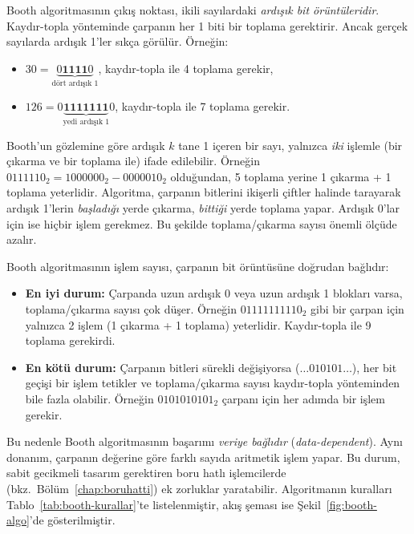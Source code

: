 Booth algoritmasının çıkış noktası, ikili sayılardaki \emph{ardışık bit örüntüleridir}. Kaydır-topla yönteminde çarpanın her 1 biti bir toplama gerektirir. Ancak gerçek sayılarda ardışık 1'ler sıkça görülür. Örneğin:
%
\begin{itemize}[nosep]
\item $30 = \underbrace{0\textbf{1111}0}_{\text{dört ardışık 1}}$, kaydır-topla ile 4 toplama gerekir,
\item $126 = 0\underbrace{\textbf{1111111}}_{\text{yedi ardışık 1}}0$, kaydır-topla ile 7 toplama gerekir.
\end{itemize}
%
Booth'un gözlemine göre ardışık $k$ tane 1 içeren bir sayı, yalnızca \emph{iki} işlemle (bir çıkarma ve bir toplama ile) ifade edilebilir. Örneğin $0111110_2 = 1000000_2 - 0000010_2$ olduğundan, 5 toplama yerine 1 çıkarma + 1 toplama yeterlidir. Algoritma, çarpanın bitlerini ikişerli çiftler halinde tarayarak ardışık 1'lerin \emph{başladığı} yerde çıkarma, \emph{bittiği} yerde toplama yapar. Ardışık 0'lar için ise hiçbir işlem gerekmez. Bu şekilde toplama/çıkarma sayısı önemli ölçüde azalır.

Booth algoritmasının işlem sayısı, çarpanın bit örüntüsüne doğrudan bağlıdır:
%
\begin{itemize}[nosep]
\item \textbf{En iyi durum:} Çarpanda uzun ardışık 0 veya uzun ardışık 1 blokları varsa, toplama/çıkarma sayısı çok düşer. Örneğin $01111111110_2$ gibi bir çarpan için yalnızca 2 işlem (1 çıkarma + 1 toplama) yeterlidir. Kaydır-topla ile 9 toplama gerekirdi.
\item \textbf{En kötü durum:} Çarpanın bitleri sürekli değişiyorsa ($\ldots 010101 \ldots$), her bit geçişi bir işlem tetikler ve toplama/çıkarma sayısı kaydır-topla yönteminden bile fazla olabilir. Örneğin $0101010101_2$ çarpanı için her adımda bir işlem gerekir.
\end{itemize}
%
Bu nedenle Booth algoritmasının başarımı \emph{veriye bağlıdır} (\emph{data-dependent}). Aynı donanım, çarpanın değerine göre farklı sayıda aritmetik işlem yapar. Bu durum, sabit gecikmeli tasarım gerektiren boru hatlı işlemcilerde (bkz.\ Bölüm~\ref{chap:boruhatti}) ek zorluklar yaratabilir. Algoritmanın kuralları Tablo~\ref{tab:booth-kurallar}'te listelenmiştir, akış şeması ise Şekil~\ref{fig:booth-algo}'de gösterilmiştir.

